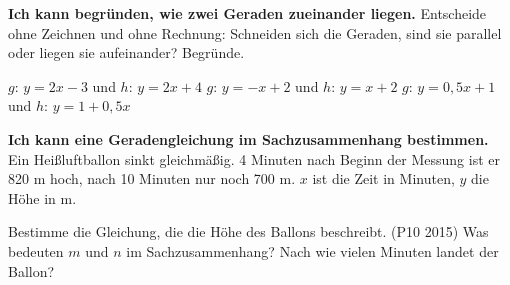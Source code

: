 \begin{aufgabe}{\textbf{Ich kann begründen, wie zwei Geraden zueinander liegen.} Entscheide ohne Zeichnen und ohne Rechnung: Schneiden sich die Geraden, sind sie parallel oder liegen sie aufeinander? Begründe.}
\begin{teile}
\teil $g$: $y = 2x - 3$ \quad und \quad $h$: $y = 2x + 4$
\teil $g$: $y = -x + 2$ \quad und \quad $h$: $y = x + 2$
\teil $g$: $y = 0{,}5x + 1$ \quad und \quad $h$: $y = 1 + 0{,}5x$
\end{teile}
\end{aufgabe}

\begin{aufgabe}{\textbf{Ich kann eine Geradengleichung im Sachzusammenhang bestimmen.} Ein Heißluftballon sinkt gleichmäßig. 4 Minuten nach Beginn der Messung ist er 820 m hoch, nach 10 Minuten nur noch 700 m. $x$ ist die Zeit in Minuten, $y$ die Höhe in m.}
\begin{teile}
\teil Bestimme die Gleichung, die die Höhe des Ballons beschreibt. (P10 2015)
\teil Was bedeuten $m$ und $n$ im Sachzusammenhang?
\teil Nach wie vielen Minuten landet der Ballon?
\end{teile}
\end{aufgabe}
